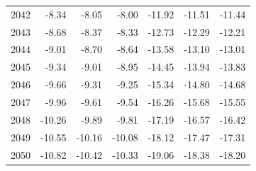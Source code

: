\begin{table}
\begin{tabular}{lrrrrrr}
2042 & -8.34 & -8.05 & -8.00 & -11.92 & -11.51 & -11.44 \\
2043 & -8.68 & -8.37 & -8.33 & -12.73 & -12.29 & -12.21 \\
2044 & -9.01 & -8.70 & -8.64 & -13.58 & -13.10 & -13.01 \\
2045 & -9.34 & -9.01 & -8.95 & -14.45 & -13.94 & -13.83 \\
2046 & -9.66 & -9.31 & -9.25 & -15.34 & -14.80 & -14.68 \\
2047 & -9.96 & -9.61 & -9.54 & -16.26 & -15.68 & -15.55 \\
2048 & -10.26 & -9.89 & -9.81 & -17.19 & -16.57 & -16.42 \\
2049 & -10.55 & -10.16 & -10.08 & -18.12 & -17.47 & -17.31 \\
2050 & -10.82 & -10.42 & -10.33 & -19.06 & -18.38 & -18.20 \\
\bottomrule
\end{tabular}
\end{table}
